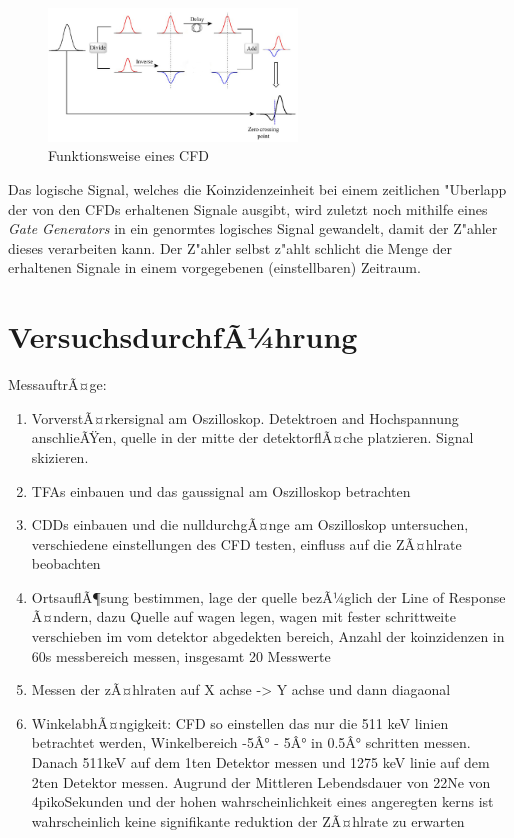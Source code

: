 \documentclass{article}
\begin{document}
\begin{figure}[!ht]
	\centering
	\includegraphics[width=250px, totalheight=250px, keepaspectratio]{CFD.PNG}
	\caption[Funktionsweise eines CFD]{Funktionsweise eines CFD\footnotemark}
	\label{figCFD}
\end{figure}

Das logische Signal, welches die Koinzidenzeinheit bei einem zeitlichen "Uberlapp der von den CFDs erhaltenen Signale ausgibt, wird zuletzt noch mithilfe eines \textit{Gate Generators} in ein genormtes logisches Signal gewandelt, damit der Z"ahler dieses verarbeiten kann. Der Z"ahler selbst z"ahlt schlicht die Menge der erhaltenen Signale in einem vorgegebenen (einstellbaren) Zeitraum.



    \section{VersuchsdurchfÃ¼hrung}
        MessauftrÃ¤ge:
        \begin{enumerate}
            \item VorverstÃ¤rkersignal am Oszilloskop. Detektroen and Hochspannung anschlieÃŸen, quelle in der mitte der detektorflÃ¤che platzieren. Signal skizieren.
            \item TFAs einbauen und das gaussignal am Oszilloskop betrachten
            \item CDDs einbauen und die nulldurchgÃ¤nge am Oszilloskop untersuchen, verschiedene einstellungen des CFD testen, einfluss auf die ZÃ¤hlrate beobachten
            \item OrtsauflÃ¶sung bestimmen, lage der quelle bezÃ¼glich der Line of Response Ã¤ndern, dazu Quelle auf wagen legen, wagen mit fester schrittweite verschieben
            im vom detektor abgedekten bereich, Anzahl der koinzidenzen in 60s messbereich messen, insgesamt 20 Messwerte
            \item Messen der zÃ¤hlraten auf X achse -> Y achse und dann diagaonal
            \item WinkelabhÃ¤ngigkeit: CFD so einstellen das nur die 511 keV linien betrachtet werden, Winkelbereich -5Â° - 5Â° in 0.5Â° schritten messen.
            Danach 511keV auf dem 1ten Detektor messen und 1275 keV linie auf dem 2ten Detektor messen. Augrund der Mittleren Lebendsdauer von 22Ne von 4pikoSekunden und der
            hohen wahrscheinlichkeit eines angeregten kerns ist wahrscheinlich keine signifikante reduktion der ZÃ¤hlrate zu erwarten
        \end{enumerate}
\end{document}
